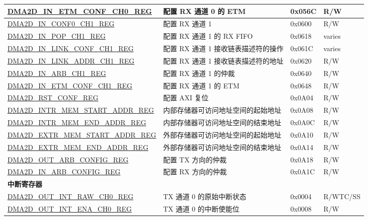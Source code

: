 \begin{longtable}{ | p{7cm} | p{11.5cm} | p{1.3cm} | p{2cm} | }
\hyperref[regdesc:DMA2DINETMCONFCHNREG]{DMA2D\_IN\_ETM\_CONF\_CH0\_REG} & 配置 RX 通道 0 的 ETM & 0x056C & R/W \\ \hline
\hyperref[regdesc:DMA2DINCONF0CHNREG]{DMA2D\_IN\_CONF0\_CH1\_REG} & 配置 RX 通道 1 & 0x0600 & R/W \\ \hline
\hyperref[regdesc:DMA2DINPOPCHNREG]{DMA2D\_IN\_POP\_CH1\_REG} & 配置 RX 通道 1 的 RX FIFO & 0x0618 & varies \\ \hline
\hyperref[regdesc:DMA2DINLINKCONFCHNREG]{DMA2D\_IN\_LINK\_CONF\_CH1\_REG} & 配置 RX 通道 1 接收链表描述符的操作 & 0x061C & varies \\ \hline
\hyperref[regdesc:DMA2DINLINKADDRCHNREG]{DMA2D\_IN\_LINK\_ADDR\_CH1\_REG} & 配置 RX 通道 1 接收链表描述符的地址 & 0x0620 & R/W \\ \hline
\hyperref[regdesc:DMA2DINARBCHNREG]{DMA2D\_IN\_ARB\_CH1\_REG} & 配置 RX 通道 1 的仲裁 & 0x0640 & R/W \\ \hline
\hyperref[regdesc:DMA2DINETMCONFCHNREG]{DMA2D\_IN\_ETM\_CONF\_CH1\_REG} & 配置 RX 通道 1 的 ETM & 0x0648 & R/W \\ \hline
\hyperref[regdesc:DMA2DRSTCONFREG]{DMA2D\_RST\_CONF\_REG} & 配置 AXI 复位 & 0x0A04 & R/W \\ \hline
\hyperref[regdesc:DMA2DINTRMEMSTARTADDRREG]{DMA2D\_INTR\_MEM\_START\_ADDR\_REG} & 内部存储器可访问地址空间的起始地址 & 0x0A08 & R/W \\ \hline
\hyperref[regdesc:DMA2DINTRMEMENDADDRREG]{DMA2D\_INTR\_MEM\_END\_ADDR\_REG} & 内部存储器可访问地址空间的结束地址 & 0x0A0C & R/W \\ \hline
\hyperref[regdesc:DMA2DEXTRMEMSTARTADDRREG]{DMA2D\_EXTR\_MEM\_START\_ADDR\_REG} & 外部存储器可访问地址空间的起始地址 & 0x0A10 & R/W \\ \hline
\hyperref[regdesc:DMA2DEXTRMEMENDADDRREG]{DMA2D\_EXTR\_MEM\_END\_ADDR\_REG} & 外部存储器可访问地址空间的结束地址 & 0x0A14 & R/W \\ \hline
\hyperref[regdesc:DMA2DOUTARBCONFIGREG]{DMA2D\_OUT\_ARB\_CONFIG\_REG} & 配置 TX 方向的仲裁 & 0x0A18 & R/W \\ \hline
\hyperref[regdesc:DMA2DINARBCONFIGREG]{DMA2D\_IN\_ARB\_CONFIG\_REG} & 配置 RX 方向的仲裁 & 0x0A1C & R/W \\ \hline
\multicolumn{4}{|l|}{\textbf{中断寄存器}} \\ \hline
\hyperref[regdesc:DMA2DOUTINTRAWCHNREG]{DMA2D\_OUT\_INT\_RAW\_CH0\_REG} & TX 通道 0 的原始中断状态 & 0x0004 & R/WTC/SS \\ \hline
\hyperref[regdesc:DMA2DOUTINTENACHNREG]{DMA2D\_OUT\_INT\_ENA\_CH0\_REG} & TX 通道 0 的中断使能位 & 0x0008 & R/W \\ \hline

\end{longtable}
